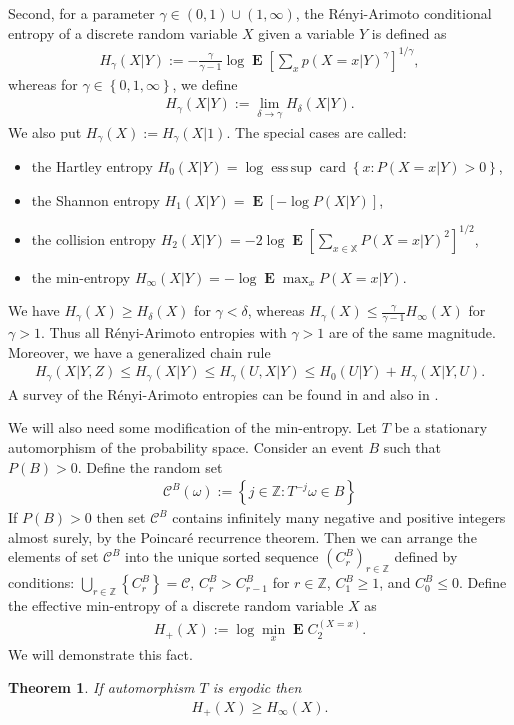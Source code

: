 \documentclass[a4paper,12pt]{article}
\newcommand{\kwad}[1]{\left[ #1 \right]}
\newcommand{\klam}[1]{\left\{ #1 \right\}}
\DeclareMathOperator{\esssup}{ess\, sup}
\DeclareMathOperator{\card}{card}
\DeclareMathOperator{\mean}{\mathbf{E}}
\newtheorem{theorem}{Theorem}
\begin{document}
Second, for a parameter $\gamma\in(0,1)\cup(1,\infty)$, the
R\'enyi-Arimoto conditional entropy of a discrete random variable $X$
given a variable $Y$ is defined as
\begin{align}
  \label{RenyiArimoto}
  H_\gamma(X|Y):=
  -\frac{\gamma}{\gamma-1}\log
  \mean\kwad{\sum_x p(X=x|Y)^{\gamma}}^{1/\gamma}
  ,
\end{align}
whereas for $\gamma\in\klam{0,1,\infty}$, we define
\begin{align}
  H_\gamma(X|Y):=\lim_{\delta\rightarrow\gamma} H_\delta(X|Y).
\end{align}
We also put $H_\gamma(X):=H_\gamma(X|1)$. The special cases are
called:
\begin{itemize}
\item the Hartley entropy
$H_0(X|Y)= \log \esssup\card\klam{x: P(X=x|Y)>0}$,
\item  the Shannon
entropy $H_1(X|Y)=\mean\kwad{-\log P(X|Y)}$, 
\item the collision entropy
$H_2(X|Y)=-2\log \mean\kwad{\sum_{x\in\mathbb{X}} P(X=x|Y)^2}^{1/2}$,
\item the min-entropy $H_\infty(X|Y)=-\log \mean\max_{x} P(X=x|Y)$.
\end{itemize}
We have $H_\gamma(X)\ge H_\delta(X)$ for $\gamma<\delta$, whereas
$H_\gamma(X)\le \frac{\gamma}{\gamma-1}H_\infty(X)$ for $\gamma>1$.
Thus all R\'enyi-Arimoto entropies with $\gamma>1$ are of the same
magnitude.  Moreover, we have a generalized chain rule
\begin{align}
  \label{Chain}
  H_\gamma(X|Y,Z)\le H_\gamma(X|Y)\le H_\gamma(U,X|Y)\le
  H_0(U|Y)+H_\gamma(X|Y,U).
\end{align}
A survey of the R\'enyi-Arimoto entropies can be found in
\citep{FehrBerens14} and also in \citep[Section 9.1]{Debowski21}.

We will also need some modification of the min-entropy.  Let $T$ be a
stationary automorphism of the probability space.  Consider an event
$B$ such that $P(B)>0$. Define the random set
\begin{align}
  \mathcal{C}^B(\omega):=\klam{j\in\mathbb{Z}: T^{-j}\omega\in B}
\end{align}
If $P(B)>0$ then set $\mathcal{C}^B$ contains infinitely many negative
and positive integers almost surely, by the Poincar\'e recurrence
theorem. Then we can arrange the elements of set $\mathcal{C}^B$ into
the unique sorted sequence $(C^B_r)_{r\in\mathbb{Z}}$ defined by
conditions: $\bigcup_{r\in\mathbb{Z}}\klam{C^B_r}=\mathcal{C}$,
$C^B_r>C^B_{r-1}$ for $r\in\mathbb{Z}$, $C^B_1\ge 1$, and
$C^B_0\le 0$. Define the effective min-entropy of a discrete random
variable $X$ as
\begin{align}
  H_+(X):=\log\min_{x} \mean C_2^{(X=x)}.
\end{align}
We will demonstrate this fact.
\begin{theorem}
  \label{theoEffective}
  If automorphism $T$ is ergodic then 
  \begin{align}
    H_+(X)\ge H_\infty(X).
  \end{align}
\end{theorem}
\end{document}
